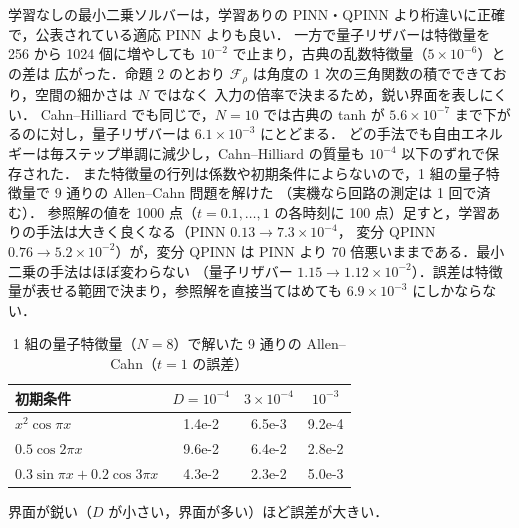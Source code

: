 \documentclass[uplatex,dvipdfmx,a4paper,10pt,twocolumn]{jsarticle}
\theoremstyle{definition}
\begin{document}
学習なしの最小二乗ソルバーは，学習ありの PINN・QPINN より桁違いに正確で，公表されている適応 PINN よりも良い．
一方で量子リザバーは特徴量を 256 から 1024 個に増やしても $10^{-2}$ で止まり，古典の乱数特徴量（$5\times10^{-6}$）との差は
広がった．命題 2 のとおり $\mathcal F_\rho$ は角度の 1 次の三角関数の積でできており，空間の細かさは $N$ ではなく
入力の倍率で決まるため，鋭い界面を表しにくい．
Cahn--Hilliard でも同じで，$N=10$ では古典の tanh が $5.6\times10^{-7}$ まで下がるのに対し，量子リザバーは $6.1\times10^{-3}$ にとどまる．
どの手法でも自由エネルギーは毎ステップ単調に減少し，Cahn--Hilliard の質量も $10^{-4}$ 以下のずれで保存された．
また特徴量の行列は係数や初期条件によらないので，1 組の量子特徴量で 9 通りの Allen--Cahn 問題を解けた
（実機なら回路の測定は 1 回で済む）．
参照解の値を 1000 点（$t=0.1,\dots,1$ の各時刻に 100 点）足すと，学習ありの手法は大きく良くなる（PINN $0.13\to7.3\times10^{-4}$，
変分 QPINN $0.76\to5.2\times10^{-2}$）が，変分 QPINN は PINN より 70 倍悪いままである．最小二乗の手法はほぼ変わらない
（量子リザバー $1.15\to1.12\times10^{-2}$）．誤差は特徴量が表せる範囲で決まり，参照解を直接当てはめても $6.9\times10^{-3}$ にしかならない．

\begin{table}[t]
\centering\small
\caption{1 組の量子特徴量（$N=8$）で解いた 9 通りの Allen--Cahn（$t=1$ の誤差）}
\begin{tabular}{lccc}
\toprule
初期条件 & $D=10^{-4}$ & $3\times10^{-4}$ & $10^{-3}$\\
\midrule
$x^2\cos\pi x$ & 1.4e-2 & 6.5e-3 & 9.2e-4\\
$0.5\cos2\pi x$ & 9.6e-2 & 6.4e-2 & 2.8e-2\\
$0.3\sin\pi x+0.2\cos3\pi x$ & 4.3e-2 & 2.3e-2 & 5.0e-3\\
\bottomrule
\end{tabular}
\end{table}
界面が鋭い（$D$ が小さい，界面が多い）ほど誤差が大きい．
\end{document}
